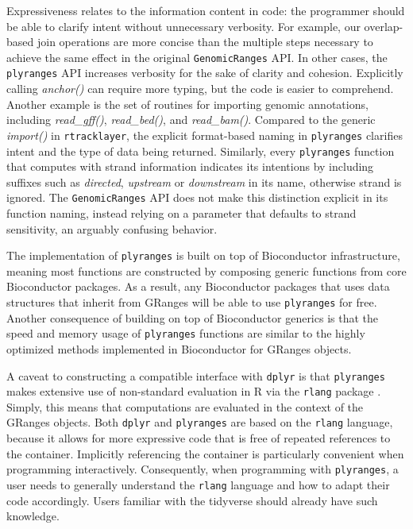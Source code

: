 \documentclass[]{article}
\begin{document}
Expressiveness relates to the information content in code: the
programmer should be able to clarify intent without unnecessary
verbosity. For example, our overlap-based join operations are more
concise than the multiple steps necessary to achieve the same effect in
the original \texttt{GenomicRanges} API. In other cases, the
\texttt{plyranges} API increases verbosity for the sake of clarity and
cohesion. Explicitly calling \emph{anchor()} can require more typing,
but the code is easier to comprehend. Another example is the set of
routines for importing genomic annotations, including
\emph{read\_gff()}, \emph{read\_bed()}, and \emph{read\_bam()}. Compared
to the generic \emph{import()} in \texttt{rtracklayer}, the explicit
format-based naming in \texttt{plyranges} clarifies intent and the type
of data being returned. Similarly, every \texttt{plyranges} function
that computes with strand information indicates its intentions by
including suffixes such as \emph{directed}, \emph{upstream} or
\emph{downstream} in its name, otherwise strand is ignored. The
\texttt{GenomicRanges} API does not make this distinction explicit in
its function naming, instead relying on a parameter that defaults to
strand sensitivity, an arguably confusing behavior.

The implementation of \texttt{plyranges} is built on top of Bioconductor
infrastructure, meaning most functions are constructed by composing
generic functions from core Bioconductor packages. As a result, any
Bioconductor packages that uses data structures that inherit from
GRanges will be able to use \texttt{plyranges} for free. Another
consequence of building on top of Bioconductor generics is that the
speed and memory usage of \texttt{plyranges} functions are similar to
the highly optimized methods implemented in Bioconductor for GRanges
objects.

A caveat to constructing a compatible interface with \texttt{dplyr} is
that \texttt{plyranges} makes extensive use of non-standard evaluation
in R via the \texttt{rlang} package \cite{R-rlang}. Simply, this means
that computations are evaluated in the context of the GRanges objects.
Both \texttt{dplyr} and \texttt{plyranges} are based on the
\texttt{rlang} language, because it allows for more expressive code that
is free of repeated references to the container. Implicitly referencing
the container is particularly convenient when programming interactively.
Consequently, when programming with \texttt{plyranges}, a user needs to
generally understand the \texttt{rlang} language and how to adapt their
code accordingly. Users familiar with the tidyverse should already have
such knowledge.
\end{document}
